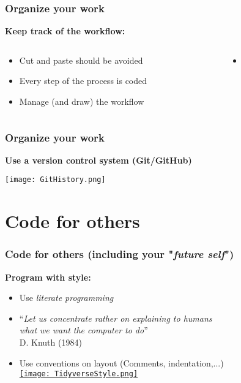 \documentclass[xcolor=x11names,compress]{beamer}
\renewcommand{\(}{\begin{columns}}
\renewcommand{\)}{\end{columns}}
\newcommand{\<}[1]{\begin{column}{#1}}
\renewcommand{\>}{\end{column}}
\begin{document}
\begin{frame}
\frametitle{Organize your work }
\textcolor{siap}{\textbf{Keep track of the workflow:} \\  }
 \begin{columns}[t]
 \begin{column}{0.5\textwidth}
    \begin{itemize}[<+->]
     \item Cut and paste should be avoided
     \item Every step of the process is coded
     \item Manage (and draw) the workflow
   \end{itemize}
  \end{column}
 \begin{column}{0.5\textwidth}
    \begin{itemize}
        \item[]
    \end{itemize}
  \end{column}
\end{columns}
\end{frame}

\begin{frame}
\frametitle{Organize your work }
\textcolor{siap}{\textbf{Use a version control system  (Git/GitHub)}} \\
\vspace{0.5cm}
\begin{center}
 \texttt{[image: GitHistory.png]}
\end{center}
\end{frame}

\section{Code for others}

\begin{frame}[<+->]
\frametitle{Code for others (including your "\emph{future self}")}
\textcolor{siap}{\textbf{Program with style:}} \\
          \begin{itemize}
             \item Use \emph{literate programming}
             \item[] \begin{center}
                    ``\textit{Let us concentrate rather on explaining to humans \\ what we want the computer to do}'' \\
                    \hfill \textcolor{gris}{ D. Knuth (1984)}
             \end{center}
             \item Use conventions on layout (Comments, indentation,...)  \\
             \href{https://style.tidyverse.org/index.html}{\texttt{[image: TidyverseStyle.png]}}
         \end{itemize}
\end{frame}
\end{document}
